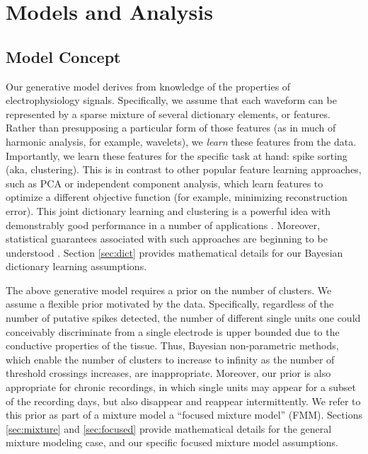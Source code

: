 \documentclass[journal]{IEEEtran}
\begin{document}
\section{Models and Analysis\label{sec:models}}

\subsection{Model Concept} %
\label{sub:concept1}

Our generative model derives from knowledge of the properties of electrophysiology signals.  
Specifically, we assume that each waveform can be represented by a sparse mixture of several dictionary elements, or features.  Rather than presupposing a particular form of those features (as in much of harmonic analysis, for example, wavelets), we \emph{learn} these features from the data.  Importantly, we learn these features for the specific task at hand: spike sorting (aka, clustering).  This is in contrast to other popular feature learning approaches, such as PCA or independent component analysis, which learn features to optimize a different objective function (for example, minimizing reconstruction error).  This joint dictionary learning and clustering is a powerful idea with demonstrably good performance in a number of applications \cite{??}.  Moreover, statistical guarantees associated with such approaches are beginning to be understood \cite{??}.  Section \ref{sec:dict} provides mathematical details for our Bayesian dictionary learning assumptions.

The above generative model requires a prior on the number of clusters.  We assume a flexible prior motivated by the data.  Specifically, regardless of the number of putative spikes detected, the number of different single units one could conceivably discriminate from a single electrode is upper bounded due to the conductive properties of the tissue.  Thus, Bayesian non-parametric methods, which enable the number of clusters to increase to infinity as the number of threshold crossings increases, are inappropriate.  Moreover, our prior is also appropriate for chronic recordings, in which single units may appear for a subset of the recording days, but also disappear and reappear intermittently.  We refer to this prior as part of a mixture model a ``focused mixture model'' (FMM).  Sections \ref{sec:mixture} and \ref{sec:focused} provide mathematical details for the general mixture modeling case, and our specific focused mixture model assumptions.
\end{document}
